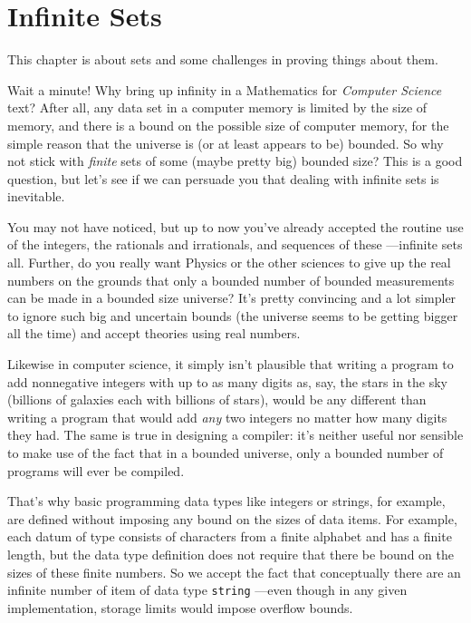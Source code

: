 \newcommand{\nohalt}{\text{\small{No-halt}}}
\newcommand{\asciistr}{\text{$\mathcal{S}$}}

\chapter{Infinite Sets}\label{infinite_chap}\label{set_theory_chap}


This chapter is about  sets and some challenges in
proving things about them.

Wait a minute!  Why bring up infinity in a Mathematics for
\emph{Computer Science} text?
After all, any data set in a computer memory is limited by the size of
memory, and there is a bound on the possible size of computer memory,
for the simple reason that the universe is (or at least appears to be)
bounded.  So why not stick with \emph{finite} sets of some (maybe
pretty big) bounded size?  
This is a good question, but let's see if we can persuade you that
dealing with infinite sets is inevitable.

\iffalse We've run into a lot of computer science students who wonder
why they should care about infinite sets.  They point out that
\fi

You may not have noticed, but up to now you've already accepted the
routine use of the integers, the rationals and irrationals, and
sequences of these ---infinite sets all.  Further, do you really want
Physics or the other sciences to give up the real numbers on the
grounds that only a bounded number of bounded measurements can be made
in a bounded size universe?  It's pretty convincing and a lot simpler
to ignore such big and uncertain bounds (the universe seems to be
getting bigger all the time) and accept theories using real numbers.

Likewise in computer science, it simply isn't plausible that writing a
program to add nonnegative integers with up to as many digits as, say,
the stars in the sky (billions of galaxies each with billions of
stars), would be any different than writing a program that would add
\emph{any} two integers no matter how many digits they had.  The same
is true in designing a compiler: it's neither useful nor sensible to
make use of the fact that in a bounded universe, only a bounded number
of programs will ever be compiled.

\iffalse That's why basic programming data types like integers or
strings, for example, are defined without imposing any bound on the
sizes of data items.  For example, each datum of type
 consists of characters from a finite alphabet
and has a finite length, but the data type definition does not require
that there be bound on the sizes of these finite numbers.  So we
accept the fact that conceptually there are an infinite number of item
of data type \texttt{string} ---even though in any given
implementation, storage limits would impose overflow bounds.

